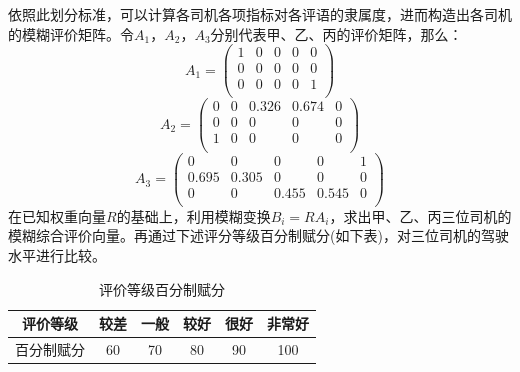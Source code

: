 \documentclass[bwprint]{cumcmthesis}
\begin{document}
            依照此划分标准，可以计算各司机各项指标对各评语的隶属度，进而构造出各司机的模糊评价矩阵。令$A_1$，$A_2$，$A_3$分别代表甲、乙、丙的评价矩阵，那么：
            \[
                A_1 = 
                \begin{pmatrix}
                    1 & 0 & 0 & 0 & 0  \\
                    0 & 0 & 0 & 0 & 0  \\
                    0 & 0 & 0 & 0 & 1  \\
                \end{pmatrix}
            \]
            \[    
                A_2 = 
                \begin{pmatrix}
                    0 & 0 & 0.326 & 0.674 & 0  \\
                    0 & 0 & 0 & 0 & 0  \\
                    1 & 0 & 0 & 0 & 0  \\
                \end{pmatrix}
            \]
            \[
                A_3 = 
                \begin{pmatrix}
                    0 & 0 & 0 & 0 & 1  \\
                    0.695 & 0.305 & 0 & 0 & 0  \\
                    0 & 0 & 0.455 & 0.545 & 0  \\
                \end{pmatrix}
            \]
            在已知权重向量$R$的基础上，利用模糊变换$B_i=RA_i$，求出甲、乙、丙三位司机的模糊综合评价向量。再通过下述评分等级百分制赋分(如下表)，对三位司机的驾驶水平进行比较。
            \begin{table}[htbp]
                \centering
                \caption{评价等级百分制赋分}
                    \begin{tabular}{|c|c|c|c|c|c|}
                    \hline
                    评价等级  & 较差    & 一般    & 较好    & 很好    & 非常好 \\
                    \hline
                    百分制赋分 & 60    & 70    & 80    & 90    & 100 \\
                    \hline
                    \end{tabular}
                \label{tab:ten}
            \end{table}
            
\end{document}
